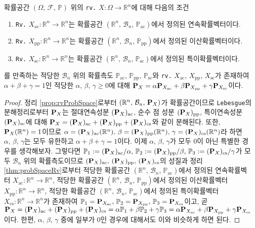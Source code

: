 \begin{theorem}
    확률공간 $(\Omega,\,\mathcal{F},\,\mathbb{P})$ 위의 \texttt{rv.} $X:\Omega\to\mathbb{R}^n$에 대해 다음의 조건
    \begin{enumerate}
        \item \texttt{Rv.} $X_\mathrm{ac}:\mathbb{R}^n\to\mathbb{R}^n$는 확률공간 $(\mathbb{R}^n,\,\mathcal{B}_n,\,\mathbb{P}_\mathrm{ac})$에서 정의된 연속확률벡터이다.
        \item \texttt{Rv.} $X_\mathrm{pp}:\mathbb{R}^n\to\mathbb{R}^n$는 확률공간 $(\mathbb{R}^n,\,\mathcal{B}_n,\,\mathbb{P}_\mathrm{pp})$에서 정의된 이산확률벡터이다.
        \item \texttt{Rv.} $X_\mathrm{sc}:\mathbb{R}^n\to\mathbb{R}^n$는 확률공간 $(\mathbb{R}^n,\,\mathcal{B}_n,\,\mathbb{P}_\mathrm{sc})$에서 정의된 특이확률벡터이다.
    \end{enumerate}
    를 만족하는 적당한 $\mathcal{B}_n$ 위의 확률측도 $\mathbb{P}_\mathrm{ac},\,\mathbb{P}_\mathrm{pp},\,\mathbb{P}_\mathrm{sc}$와 \texttt{rv.} $X_\mathrm{ac},\,X_\mathrm{pp},\,X_\mathrm{sc}$가 존재하여 $\alpha+\beta+\gamma=1$인 적당한 $\alpha,\,\beta,\,\gamma\geq0$에 대해 $\mathbf{P}_X=\alpha\mathbf{P}_{X_\mathrm{ac}}+\beta\mathbf{P}_{X_\mathrm{pp}}+\gamma\mathbf{P}_{X_\mathrm{sc}}$이다.
\end{theorem}

\begin{proof}
    정리 \ref{prop:rvProbSpace}로부터 $(\mathbb{R}^n,\,\mathcal{B}_n,\,\mathbf{P}_X)$가 확률공간이므로 \texttt{Lebesgue}의 분해정리로부터 $\mathbf{P}_X$는 절대연속성분 $(\mathbf{P}_X)_\mathrm{ac}$, 순수 점 성분 $(\mathbf{P}_X)_\mathrm{pp}$, 특이연속성분 $(\mathbf{P}_X)_\mathrm{sc}$에 대해 $\mathbf{P}_X=(\mathbf{P}_X)_\mathrm{ac}+(\mathbf{P}_X)_\mathrm{pp}+(\mathbf{P}_X)_\mathrm{cs}$와 같이 분해된다. 또한, $\mathbf{P}_X(\mathbb{R}^n)=1$이므로 $\alpha=(\mathbf{P}_X)_\mathrm{ac}(\mathbb{R}^n),\,\beta=(\mathbf{P}_X)_\mathrm{pp}(\mathbb{R}^n),\,\gamma=(\mathbf{P}_X)_\mathrm{cs}(\mathbb{R}^n)$라 하면 $\alpha,\,\beta,\,\gamma$는 모두 유한하고 $\alpha+\beta+\gamma=1$이다. 이제 $\alpha,\,\beta,\,\gamma$가 모두 $0$이 아닌 특별한 경우를 생각해보자. 그렇다면 $\mathbb{P}_1:=(\mathbf{P}_X)_\mathrm{ac}/\alpha,\,\mathbb{P}_2:=(\mathbf{P}_X)_\mathrm{pp}/\beta,\,\mathbb{P}_3:=(\mathbf{P}_X)_\mathrm{cs}/\gamma$가 모두 $\mathcal{B}_n$ 위의 확률측도이므로 $(\mathbf{P}_X)_\mathrm{ac},\,(\mathbf{P}_X)_\mathrm{pp},\,(\mathbf{P}_X)_\mathrm{cs}$의 성질과 정리 \ref{thm:probSpaceRv}로부터 적당한 확률공간 $(\mathbb{R}^n,\,\mathcal{B}_n,\,\mathbb{P}_\mathrm{ac})$에서 정의된 연속확률벡터 $X_\mathrm{ac}:\mathbb{R}^n\to\mathbb{R}^n$, 적당한 확률공간 $(\mathbb{R}^n,\,\mathcal{B}_n,\,\mathbb{P}_\mathrm{pp})$에서 정의된 이산확률벡터 $X_\mathrm{pp}:\mathbb{R}^n\to\mathbb{R}^n$, 적당한 확률공간 $(\mathbb{R}^n,\,\mathcal{B}_n,\,\mathbb{P}_\mathrm{sc})$에서 정의된 특이확률벡터 $X_\mathrm{cs}:\mathbb{R}^n\to\mathbb{R}^n$가 존재하여 $\mathbb{P}_1=\mathbf{P}_{X_\mathrm{ac}},\,\mathbb{P}_2=\mathbf{P}_{X_\mathrm{pp}},\,\mathbb{P}_3=\mathbf{P}_{X_\mathrm{cs}}$이고, 곧 $\mathbf{P}_X=(\mathbf{P}_X)_\mathrm{ac}+(\mathbf{P}_X)_\mathrm{pp}+(\mathbf{P}_X)_\mathrm{cs}=\alpha\mathbb{P}_1+\beta\mathbb{P}_2+\gamma\mathbb{P}_3=\alpha\mathbf{P}_{X_\mathrm{ac}}+\beta\mathbf{P}_{X_\mathrm{pp}}+\gamma\mathbf{P}_{X_\mathrm{cs}}$이다. 한편, $\alpha,\,\beta,\,\gamma$ 중에 일부가 $0$인 경우에 대해서도 이와 비슷하게 하면 된다.
\end{proof}

